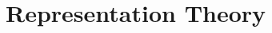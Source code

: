 \documentclass[10pt]{ucthesis}
\begin{document}












\chapter{Representation Theory}
\end{document}
